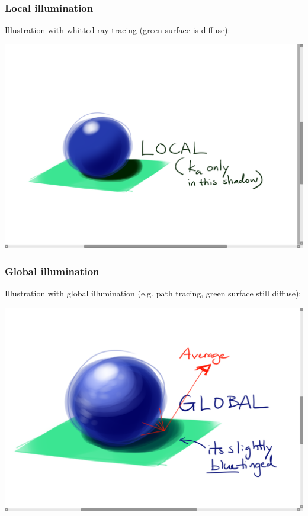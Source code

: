 \documentclass{beamer}
\begin{document}
\begin{frame}
    \frametitle{Local illumination}

    Illustration with whitted ray tracing (green surface is diffuse):
    \begin{center}
        \includegraphics[scale=0.3]{local.png}
    \end{center}

\end{frame}

\begin{frame}
    \frametitle{Global illumination}

    Illustration with global illumination (e.g. path tracing, green surface still diffuse):
    \begin{center}
        \includegraphics[scale=0.3]{global.png}
    \end{center}

\end{frame}
\end{document}
